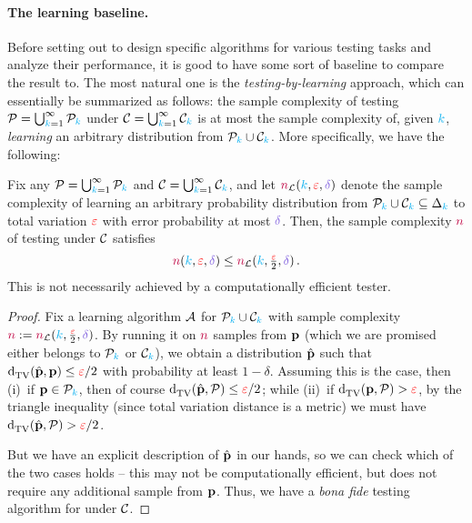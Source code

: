 \paragraph{The learning baseline.}
Before setting out to design specific algorithms for various testing tasks and analyze their performance, it is good to have some sort of baseline to compare the result to. The most natural one is the \emph{testing-by-learning} approach, which can essentially be summarized as follows: the sample complexity of testing $\mathcal{P}= \bigcup_{{\textcolor{cyan}{k}}=1}^\infty \mathcal{P}_{\textcolor{cyan}{k}}$ under $\mathcal{C}= \bigcup_{{\textcolor{cyan}{k}}=1}^\infty \mathcal{C}_{\textcolor{cyan}{k}}$ is at most the sample complexity of, given ${\textcolor{cyan}{k}}$, \emph{learning} an arbitrary distribution from $\mathcal{P}_{\textcolor{cyan}{k}}\cup\mathcal{C}_{\textcolor{cyan}{k}}$. More specifically, we have the following:
\begin{lemma}
	\label{lemma:learning:baseline}
  Fix any $\mathcal{P}= \bigcup_{{\textcolor{cyan}{k}}=1}^\infty \mathcal{P}_{\textcolor{cyan}{k}}$ and $\mathcal{C}= \bigcup_{{\textcolor{cyan}{k}}=1}^\infty \mathcal{C}_{\textcolor{cyan}{k}}$, and let $\ns_{\mathcal{L}}(\ab,\dst,\errprob)$ denote the sample complexity of learning an arbitrary probability distribution from $\mathcal{P}_{\textcolor{cyan}{k}}\cup\mathcal{C}_{\textcolor{cyan}{k}}\subseteq \Delta_{{\textcolor{cyan}{k}}}$ to total variation $\textcolor{red}{\varepsilon}$ with error probability at most $\errprob$. Then, the sample complexity ${\textcolor{purple}{n}}$ of testing \property under $\mathcal{C}$ satisfies
  \[
      \ns(\ab,\dst,\errprob) \leq \ns_{\mathcal{L}}(\ab,\tfrac{\dst}{2},\errprob)\,.
  \]
  This is not necessarily achieved by a computationally efficient tester.
\end{lemma}
\begin{proof}
Fix a learning algorithm $\mathcal{A}$ for $\mathcal{P}_{\textcolor{cyan}{k}}\cup\mathcal{C}_{\textcolor{cyan}{k}}$ with sample complexity $\ns\eqdef \ns_{\mathcal{L}}(\ab,\tfrac{\dst}{2},\errprob)$. By running it on ${\textcolor{purple}{n}}$ \iid samples from $\mathbf{p}$ (which we are promised either belongs to $\mathcal{P}_{\textcolor{cyan}{k}}$ or $\mathcal{C}_{\textcolor{cyan}{k}}$), we obtain a distribution $\hat{\mathbf{p}}$ such that $\totalvardist{\hat{\p}}{\p} \leq \dst/2$ with probability at least $1-\delta$. Assuming this is the case, then (i)~if $\mathbf{p}\in\mathcal{P}_{\textcolor{cyan}{k}}$, then of course $\totalvardist{\hat{\p}}{\property} \leq \dst/2$; while (ii)~if $\totalvardist{\p}{\property} > \dst$, by the triangle inequality (since total variation distance is a metric) we must have $\totalvardist{\hat{\p}}{\property} > \dst/2$. 

But we have an explicit description of $\hat{\mathbf{p}}$ in our hands, so we can check which of the two cases holds -- this may not be computationally efficient, but does not require any additional sample from $\mathbf{p}$. Thus, we have a \emph{bona fide} testing algorithm for \property under $\mathcal{C}$.
\end{proof}

